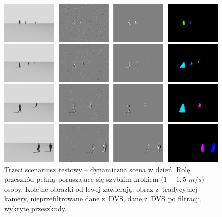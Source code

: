 \begin{figure}
    \centering
    \begin{minipage}{1\textwidth}
        \centering
        \includegraphics[width = 1\textwidth]{images/walk_day1.png}
    \end{minipage}
    \begin{minipage}{1\textwidth}
        \centering
        \includegraphics[width = 1\textwidth]{images/walk_day2.png}
    \end{minipage}
    \begin{minipage}{1\textwidth}
        \centering
        \includegraphics[width = 1\textwidth]{images/walk_day3.png}
    \end{minipage}
    \begin{minipage}{1\textwidth}
        \centering
        \includegraphics[width = 1\textwidth]{images/walk_day4.png}
    \end{minipage}
  
    \caption{Trzeci scenariusz testowy -- dynamiczna scena w dzień. Rolę przeszkód pełnią poruszające się szybkim krokiem ($1-1,5$ $m/s$) osoby. Kolejne obrazki od lewej zawierają: obraz z~tradycyjnej kamery, nieprzefiltrowane dane z~DVS, dane z~DVS po filtracji, wykryte przeszkody.}
    \label{fig:walk_day}
\end{figure}

\vspace{11px}

